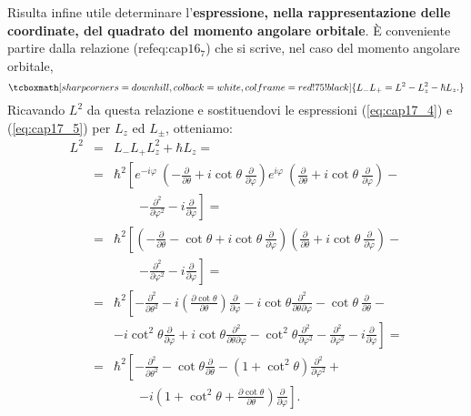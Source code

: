 Risulta infine utile determinare l'\textbf{espressione, nella rappresentazione delle coordinate, del quadrato del momento angolare orbitale}. È conveniente partire dalla relazione (refeq:cap$16_7$) che si scrive, nel caso del momento angolare orbitale,
	\begin{equation}
		\tcboxmath[sharp corners=downhill, colback=white, colframe=red!75!black]{
			L_- L_+ = L^2 -L_z ^2 -\hbar L_z .
			}
	\end{equation}
Ricavando $L^2$ da questa relazione e sostituendovi le espressioni (\ref{eq:cap17_4}) e (\ref{eq:cap17_5}) per $L_z$ ed $L_{\pm}$, otteniamo:
\begin{eqnarray}
L^2 &=& L_-L_+ L_z^2 +\hbar L_z = \nonumber \\
&=& \hbar ^2 \left[e^{-i\varphi}\ \left(-\frac{\partial}{\partial \theta}+i \cot \theta\ \frac{\partial}{\partial \varphi}\right)e^{i\varphi}\ \left(\frac{\partial}{\partial \theta}+i \cot \theta\ \frac{\partial}{\partial \varphi}\right)-\right. \nonumber \\
& &\qquad \left. -\frac{\partial ^2}{\partial \varphi ^2}- i\frac{\partial}{\partial \varphi}\right] = \nonumber \\
&=&\hbar ^ 2 \left[ \left( -\frac{\partial}{\partial \theta}-\cot\theta +i \cot\theta\ \frac{\partial}{\partial \varphi}\right)\left(\frac{\partial}{\partial \theta}+i \cot \theta \ \frac{\partial}{\partial \varphi}\right)-\right. \nonumber \\
& &\qquad \left. -\frac{\partial ^2}{\partial \varphi ^2}- i\frac{\partial}{\partial \varphi}\right] = \nonumber \\
&=& \hbar ^2 \left[ -\frac{\partial ^2}{\partial \theta ^2}-i\left( \frac{\partial \cot \theta}{\partial \theta}\right) \frac{\partial }{\partial \varphi }-i\cot \theta \frac{\partial ^2}{\partial \theta \partial \varphi}-\cot \theta\ \frac{\partial }{\partial \theta}-\right. \nonumber \\
& & \left. -i \cot ^2 \theta \frac{\partial }{\partial \varphi}+i \cot\theta \frac{\partial ^2}{\partial \theta \partial \varphi}-\cot ^2 \theta \frac{\partial ^2}{\partial \varphi ^2}-\frac{\partial ^2}{\partial \varphi ^2}-i\frac{\partial }{\partial \varphi}\right] = \nonumber \\
&=& \hbar^2 \left[ -\frac{\partial ^2}{\partial \theta ^2}-\cot \theta \frac{\partial }{\partial \theta}-\left(1+ \cot ^2 \theta\right) \frac{\partial ^2}{\partial \varphi ^2}+\right. \nonumber \\
& &\qquad \left. -i\left( 1+\cot ^2 \theta +\frac{\partial \cot \theta}{\partial \theta}\right)\frac{\partial}{\partial \varphi}\right] .
\end{eqnarray}
